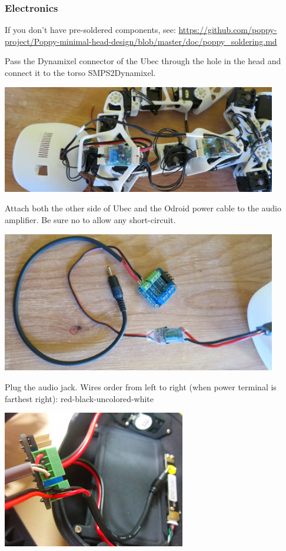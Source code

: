 \documentclass[includefoot]{article}
\begin{document}
\subsubsection{Electronics}

If you don't have pre-soldered components, see: \url{https://github.com/poppy-project/Poppy-minimal-head-design/blob/master/doc/poppy_soldering.md}



Pass the Dynamixel connector of the Ubec through the hole in the head and connect it to the torso SMPS2Dynamixel.

\begin{center}
  \includegraphics[width=0.9\textwidth]{img/power_wiring}
 \end{center}


Attach both the other side of Ubec and the Odroid power cable to the audio amplifier. Be sure no to allow any short-circuit.

\begin{center}
  \includegraphics[width=0.9\textwidth]{img/head_ampli_power}
 \end{center}
 
 
Plug the audio jack. Wires order from left to right (when power terminal is farthest right): red-black-uncolored-white

\begin{center}
  \includegraphics[width=0.6\textwidth]{img/audio_amp_connection_zoom}
 \end{center}
\end{document}
